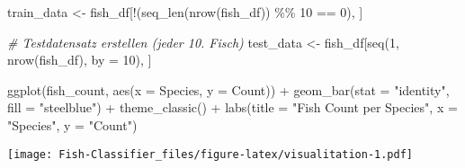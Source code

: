 \documentclass[
]{article}
\newenvironment{Shaded}{\begin{snugshade}}{\end{snugshade}}
\newcommand{\AttributeTok}[1]{\textcolor[rgb]{0.77,0.63,0.00}{#1}}
\newcommand{\CommentTok}[1]{\textcolor[rgb]{0.56,0.35,0.01}{\textit{#1}}}
\newcommand{\DecValTok}[1]{\textcolor[rgb]{0.00,0.00,0.81}{#1}}
\newcommand{\FunctionTok}[1]{\textcolor[rgb]{0.00,0.00,0.00}{#1}}
\newcommand{\NormalTok}[1]{#1}
\newcommand{\OtherTok}[1]{\textcolor[rgb]{0.56,0.35,0.01}{#1}}
\newcommand{\SpecialCharTok}[1]{\textcolor[rgb]{0.00,0.00,0.00}{#1}}
\newcommand{\StringTok}[1]{\textcolor[rgb]{0.31,0.60,0.02}{#1}}
\begin{document}
\begin{Shaded}
\begin{Highlighting}[]
\NormalTok{train\_data }\OtherTok{\textless{}{-}}\NormalTok{ fish\_df[}\SpecialCharTok{!}\NormalTok{(}\FunctionTok{seq\_len}\NormalTok{(}\FunctionTok{nrow}\NormalTok{(fish\_df)) }\SpecialCharTok{\%\%} \DecValTok{10} \SpecialCharTok{==} \DecValTok{0}\NormalTok{), ]}

\CommentTok{\# Testdatensatz erstellen (jeder 10. Fisch)}
\NormalTok{test\_data }\OtherTok{\textless{}{-}}\NormalTok{ fish\_df[}\FunctionTok{seq}\NormalTok{(}\DecValTok{1}\NormalTok{, }\FunctionTok{nrow}\NormalTok{(fish\_df), }\AttributeTok{by =} \DecValTok{10}\NormalTok{), ]}
\end{Highlighting}
\end{Shaded}

\begin{Shaded}
\begin{Highlighting}[]
\FunctionTok{ggplot}\NormalTok{(fish\_count, }\FunctionTok{aes}\NormalTok{(}\AttributeTok{x =}\NormalTok{ Species, }\AttributeTok{y =}\NormalTok{ Count)) }\SpecialCharTok{+}
  \FunctionTok{geom\_bar}\NormalTok{(}\AttributeTok{stat =} \StringTok{"identity"}\NormalTok{, }\AttributeTok{fill =} \StringTok{"steelblue"}\NormalTok{) }\SpecialCharTok{+}
  \FunctionTok{theme\_classic}\NormalTok{() }\SpecialCharTok{+}
  \FunctionTok{labs}\NormalTok{(}\AttributeTok{title =} \StringTok{"Fish Count per Species"}\NormalTok{,}
       \AttributeTok{x =} \StringTok{"Species"}\NormalTok{,}
       \AttributeTok{y =} \StringTok{"Count"}\NormalTok{)}
\end{Highlighting}
\end{Shaded}

\texttt{[image: Fish-Classifier\_files/figure-latex/visualitation-1.pdf]}
\end{document}
